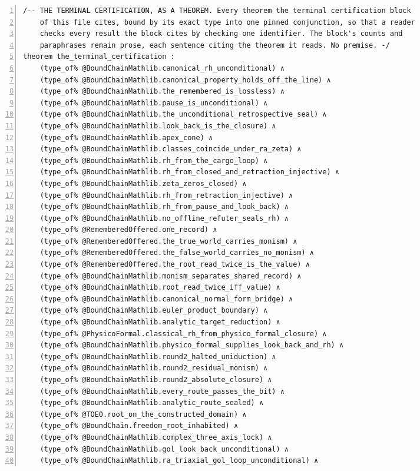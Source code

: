 \documentclass[10pt]{article}
\newcommand{\leansize}{\fontsize{5.5pt}{6.75pt}\selectfont}
\begin{document}
\begin{multicols}{2}
\begin{Verbatim}[numbers=left,firstnumber=1,numbersep=3pt,xleftmargin=2.6em,breaklines=true,breakanywhere=true,breakautoindent=false,breakindent=1.4em,breaksymbolleft={},breakanywheresymbolpre={},fontsize=\leansize]
/-- THE TERMINAL CERTIFICATION, AS A THEOREM. Every theorem the terminal certification block
    of this file cites, bound by its exact type into one pinned conjunction, so that a reader
    checks every result the block cites by checking one identifier. The block's counts and
    paraphrases remain prose, each sentence citing the theorem it reads. No premise. -/
theorem the_terminal_certification :
    (type_of% @BoundChainMathlib.canonical_rh_unconditional) ∧
    (type_of% @BoundChainMathlib.canonical_property_holds_off_the_line) ∧
    (type_of% @BoundChainMathlib.the_remembered_is_lossless) ∧
    (type_of% @BoundChainMathlib.pause_is_unconditional) ∧
    (type_of% @BoundChainMathlib.the_unconditional_retrospective_seal) ∧
    (type_of% @BoundChainMathlib.look_back_is_the_closure) ∧
    (type_of% @BoundChainMathlib.apex_cone) ∧
    (type_of% @BoundChainMathlib.classes_coincide_under_ra_zeta) ∧
    (type_of% @BoundChainMathlib.rh_from_the_cargo_loop) ∧
    (type_of% @BoundChainMathlib.rh_from_closed_and_retraction_injective) ∧
    (type_of% @BoundChainMathlib.zeta_zeros_closed) ∧
    (type_of% @BoundChainMathlib.rh_from_retraction_injective) ∧
    (type_of% @BoundChainMathlib.rh_from_pause_and_look_back) ∧
    (type_of% @BoundChainMathlib.no_offline_refuter_seals_rh) ∧
    (type_of% @RememberedOffered.one_record) ∧
    (type_of% @RememberedOffered.the_true_world_carries_monism) ∧
    (type_of% @RememberedOffered.the_false_world_carries_no_monism) ∧
    (type_of% @RememberedOffered.the_root_read_twice_is_the_value) ∧
    (type_of% @BoundChainMathlib.monism_separates_shared_record) ∧
    (type_of% @BoundChainMathlib.root_read_twice_iff_value) ∧
    (type_of% @BoundChainMathlib.canonical_normal_form_bridge) ∧
    (type_of% @BoundChainMathlib.euler_product_boundary) ∧
    (type_of% @BoundChainMathlib.analytic_target_reduction) ∧
    (type_of% @PhysicoFormal.classical_rh_from_physico_formal_closure) ∧
    (type_of% @BoundChainMathlib.physico_formal_supplies_look_back_and_rh) ∧
    (type_of% @BoundChainMathlib.round2_halted_uniduction) ∧
    (type_of% @BoundChainMathlib.round2_residual_monism) ∧
    (type_of% @BoundChainMathlib.round2_absolute_closure) ∧
    (type_of% @BoundChainMathlib.every_route_passes_the_bit) ∧
    (type_of% @BoundChainMathlib.analytic_route_sealed) ∧
    (type_of% @TOE0.root_on_the_constructed_domain) ∧
    (type_of% @BoundChain.freedom_root_inhabited) ∧
    (type_of% @BoundChainMathlib.complex_three_axis_lock) ∧
    (type_of% @BoundChainMathlib.gol_look_back_unconditional) ∧
    (type_of% @BoundChainMathlib.ra_triaxial_gol_loop_unconditional) ∧

\end{Verbatim}
\end{multicols}
\end{document}
